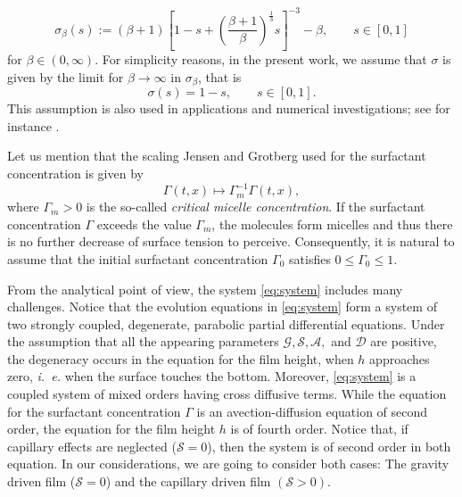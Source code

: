 \documentclass[reqno,11pt]{amsart}
\begin{document}
\[
\sigma_\beta (s):= (\beta +1) \left[1-s+\left(\frac{\beta +1}{\beta}\right)^\frac{1}{3}s\right]^{-3}-\beta, \qquad s\in[0,1]
\]
for $\beta \in (0,\infty)$. For simplicity reasons, in the present work, we assume that $\sigma$ is given by the limit for $\beta\to  \infty$ in $\sigma_\beta$, that is
$$
\sigma (s)= 1-s, \qquad s\in[0,1].
$$
This assumption is also used in applications and numerical investigations; see for instance \cite{JG2, BGN03, BN04, WCM,HY}.






Let us mention that the scaling Jensen and Grotberg used for the surfactant concentration is given by
\[
\Gamma(t,x)\mapsto \Gamma_m^{-1} \Gamma( t, x),
\]
where $\Gamma_m>0$ is the so-called \emph{critical micelle concentration}. If the surfactant concentration $\Gamma$ exceeds the value $\Gamma_m$, the molecules form micelles and thus there is no further decrease of surface tension to perceive. Consequently, it is natural to assume that the initial surfactant concentration $\Gamma_0$ satisfies $0\leq \Gamma_0\leq 1$.

\medskip

From the analytical point of view, the system \eqref{eq:system} includes many challenges. Notice that the evolution equations in \eqref{eq:system} form a system of two strongly coupled, degenerate, parabolic partial differential equations. Under the assumption that all the appearing parameters $\mathcal G, \mathcal S, \mathcal A,$ and $\mathcal D$ are positive, the degeneracy occurs in the equation for the film height, when $h$ approaches zero, \emph{i.~e.} when the surface touches the bottom. Moreover, \eqref{eq:system} is a coupled system of mixed orders having cross diffusive terms. While the equation for the surfactant concentration $\Gamma$ is an avection-diffusion equation of second order, the equation for the film height $h$ is of fourth order. Notice that, if capillary effects are neglected ($\mathcal{S}=0$), then the system is of second order in both equation. In our considerations, we are going to consider both cases: The gravity driven film ($\mathcal{S}=0$) and the capillary driven film $(\mathcal{S}>0)$.

\medskip
\end{document}
